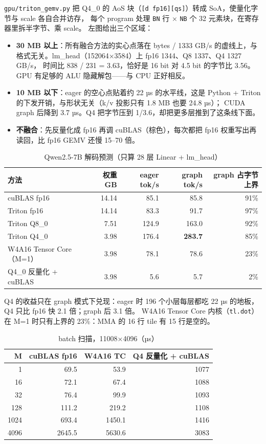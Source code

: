 \documentclass[11pt,a4paper]{ctexart}
\begin{document}
\texttt{gpu/triton\_gemv.py} 把 Q4\_0 的 AoS 块（\texttt{[d fp16][qs]}）转成 SoA，使量化字节与 scale 各自合并访存，
每个 program 处理 \texttt{BN} 行 × \texttt{NB} 个 32 元素块，在寄存器里拆半字节、乘 scale。 左图给出三个区域：
\begin{itemize}
  \item \textbf{30 MB 以上}：所有融合方法的实心点落在 bytes / 1333 GB/s 的虚线上，与格式无关。lm\_head（152064×3584）上 fp16 1344、Q8 1337、Q4 1327 GB/s，
        时间比 838 / 231 = 3.63，恰好是 16 bit 对 4.5 bit 的字节比 3.56。GPU 有足够的 ALU 隐藏解包——与 CPU 正好相反。
  \item \textbf{10 MB 以下}：eager 的空心点贴着约 22 µs 的水平线，这是 Python + Triton 的下发开销，与形状无关（k/v 投影只有 1.8 MB 也要 24.8 µs）；
        CUDA graph 后降到 3.7 µs。Q4 把字节压到 1/3.6，却把更多层推到了这条线下面。
  \item \textbf{不融合}：先反量化成 fp16 再调 cuBLAS（棕色），每次都把 fp16 权重写出再读回，比 fp16 GEMV 还慢 15--70 倍。
\end{itemize}

\begin{table}[H]
\centering\small
\caption{Qwen2.5-7B 解码预测（只算 28 层 Linear + lm\_head）}\label{tab:decode}
\begin{tabular}{lrrrr}
\toprule
方法 & 权重 GB & eager tok/s & graph tok/s & graph 占字节上界 \\
\midrule
cuBLAS fp16 & 14.14 & 85.1 & 85.8 & 91\% \\
Triton fp16 & 14.14 & 83.3 & 91.7 & 97\% \\
Triton Q8\_0 & 7.51 & 124.9 & 163.0 & 92\% \\
Triton Q4\_0 & 3.98 & 176.4 & \textbf{283.7} & 85\% \\
W4A16 Tensor Core（M=1） & 3.98 & 78.1 & 78.6 & 23\% \\
Q4\_0 反量化 + cuBLAS & 3.98 & 5.6 & 5.7 & 2\% \\
\bottomrule
\end{tabular}
\end{table}

Q4 的收益只在 graph 模式下兑现：eager 时 196 个小层每层都吃 22 µs 的地板，Q4 只比 fp16 快 2.1 倍；graph 后 3.1 倍。
W4A16 Tensor Core 内核（\texttt{tl.dot}）在 M=1 时只有上界的 23\%：MMA 的 16 行 tile 有 15 行是空的。

\begin{table}[H]
\centering\small
\caption{batch 扫描，11008×4096（µs）}\label{tab:batch}
\begin{tabular}{rrrr}
\toprule
M & cuBLAS fp16 & W4A16 TC & Q4 反量化 + cuBLAS \\
\midrule
1 & 69.5 & 53.9 & 1077 \\
16 & 72.1 & 67.4 & 1088 \\
32 & 76.4 & 99.9 & 1093 \\
128 & 111.2 & 219.2 & 1108 \\
1024 & 693.4 & 1450.1 & 1416 \\
4096 & 2645.5 & 5630.6 & 3083 \\
\bottomrule
\end{tabular}
\end{table}
\end{document}
